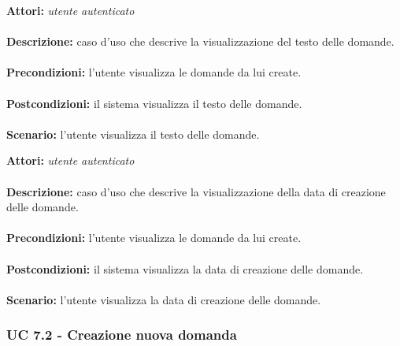 \documentclass[a4paper,11pt]{article}
\begin{document}

\textbf{Attori:} \textit{utente autenticato}
\\ \\
\textbf{Descrizione:} caso d'uso che descrive la visualizzazione del testo delle domande.\\
\\
\textbf{Precondizioni:} l'utente visualizza le domande da lui create.\\
\\
\textbf{Postcondizioni:} il sistema visualizza il testo delle domande.\\
\\
\textbf{Scenario:} l’utente visualizza il testo delle domande.\\



\textbf{Attori:} \textit{utente autenticato}
\\ \\
\textbf{Descrizione:} caso d'uso che descrive la visualizzazione della data di creazione delle domande.\\
\\
\textbf{Precondizioni:} l'utente visualizza le domande da lui create.\\
\\
\textbf{Postcondizioni:} il sistema visualizza la data di creazione delle domande.\\
\\
\textbf{Scenario:} l’utente visualizza la data di creazione delle domande.\\


\newpage
\subsubsection{UC 7.2 - Creazione nuova domanda}
\end{document}
